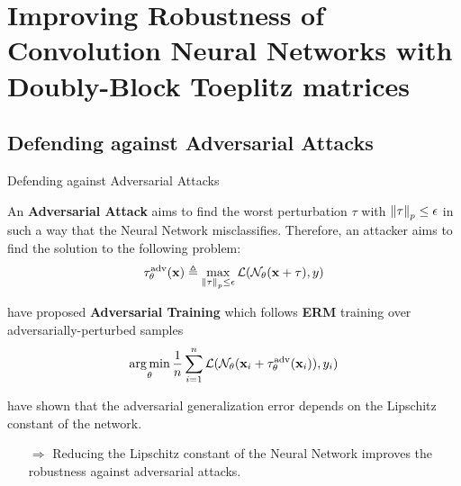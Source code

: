 \section{Improving Robustness of Convolution Neural Networks with Doubly-Block Toeplitz matrices}

\subsection{Defending against Adversarial Attacks}

\begin{frame}{Defending against Adversarial Attacks}

  An \textbf{Adversarial Attack} aims to find the worst perturbation $\tau$ with $\norm{\tau}_p \leq \epsilon$ in such a way that the Neural Network misclassifies. Therefore, an attacker aims to find the solution to the following problem:
  \begin{equation*}
    \tau_{\theta}^{\mathrm{adv}}(\mathbf{x}) \triangleq \max_{\norm{\tau}_p \leq \epsilon} \mathcal{L}(\mathcal{N}_\theta(\mathbf{x} + \tau), y)
  \end{equation*}

  \cite{goodfellow2014explaining} have proposed \textbf{Adversarial Training} which follows \textbf{ERM} training over adversarially-perturbed samples
  \begin{equation*}
    \operatorname*{arg\,min}_{\theta} \frac{1}{n} \sum_{i=1}^{n} \mathcal{L} (\mathcal{N}_\theta (\mathbf{x}_i + \tau_{\theta}^{\mathrm{adv}}(\mathbf{x}_i)), y_i)
  \end{equation*}
      
  \citet{farnia2018generalizable} have shown that the adversarial generalization error depends on the Lipschitz constant of the network. 
  \begin{itemize}
    \item[$\Rightarrow$] Reducing the Lipschitz constant of the Neural Network improves the robustness against adversarial attacks.
  \end{itemize}

\end{frame}


